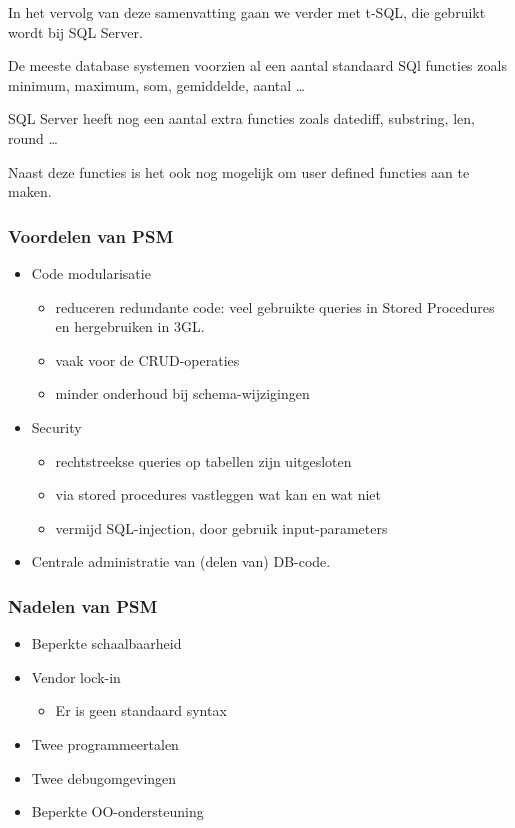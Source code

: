 \documentclass[a4paper,12pt]{article}
\begin{document}
In het vervolg van deze samenvatting gaan we verder met t-SQL, die gebruikt wordt bij SQL Server.

De meeste database systemen voorzien al een aantal standaard SQl functies zoals minimum, maximum, som, gemiddelde, aantal \dots

SQL Server heeft nog een aantal extra functies zoals datediff, substring, len, round \dots

Naast deze functies is het ook nog mogelijk om user defined functies aan te maken.

\subsubsection{Voordelen van PSM}
\begin{itemize}
\item Code modularisatie
	\begin{itemize}
	\item reduceren redundante code: veel gebruikte queries in Stored Procedures en hergebruiken in 3GL.
	\item vaak voor de CRUD-operaties
	\item minder onderhoud bij schema-wijzigingen
	\end{itemize}
\item Security
	\begin{itemize}
	\item rechtstreekse queries op tabellen zijn uitgesloten
	\item via stored procedures vastleggen wat kan en wat niet
	\item vermijd SQL-injection, door gebruik input-parameters
	\end{itemize}
\item Centrale administratie van (delen van) DB-code.
\end{itemize}

\subsubsection{Nadelen van PSM}
\begin{itemize}
\item Beperkte schaalbaarheid
\item Vendor lock-in
	\begin{itemize}
	\item Er is geen standaard syntax
	\end{itemize}
\item Twee programmeertalen
\item Twee debugomgevingen
\item Beperkte OO-ondersteuning
\end{itemize}
\end{document}
